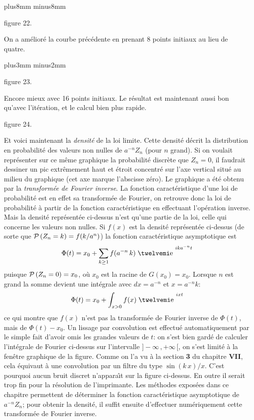 \null
\vskip-13mm plus8mm minus8mm
\centerline{ }
\vskip1mm
\centerline{\eightpoint figure 22.}
\vskip2mm
\centerline{\vbox{\hsize=9cm\eightpoint 
On a am\'elior\'e la courbe pr\'ec\'edente en prenant 8 points initiaux au 
lieu de quatre.}}

\vskip3mm
plus3mm minus2mm
\centerline{ }
\vskip1mm
\centerline{\eightpoint figure 23.}
\vskip2mm
\baselineskip=14pt 
\centerline{\vbox{\hsize=12cm\eightpoint
Encore mieux avec 16 points initiaux. Le r\'esultat est maintenant aussi
bon qu'avec l'it\'eration, et le calcul bien plus rapide.} }

\vskip1pt\break

\null\vfill
\vskip3pt
\centerline{ }
\vskip5mm
\centerline{\eightpoint figure 24.}
\vskip3mm
{\eightpoint\baselineskip=12pt
Et voici maintenant la {\it densit\'e} de la loi limite. Cette densit\'e
d\'ecrit la distribution en probabilit\'e des valeurs non nulles
de $a^{-n}Z_n$ (pour $n$ grand). Si on voulait repr\'esenter sur ce m\^eme
graphique la probabilit\'e discr\`ete que $Z_n = 0$, il faudrait dessiner 
un pic extr\^emement haut et \'etroit concentr\'e sur l'axe vertical 
situ\'e au milieu du graphique (cet axe marque l'abscisse z\'ero). 
\medskip
Le graphique a \'et\'e obtenu par la {\it transform\'ee de Fourier 
inverse}. La fonction caract\'eristique d'une loi de probabilit\'e est en 
effet sa transform\'ee de Fourier, on retrouve donc la loi de probabilit\'e
\`a partir de la  fonction caract\'eristique en effectuant l'op\'eration
inverse.  Mais la densit\'e repr\'esent\'ee ci-dessus n'est qu'une partie 
de la loi,  celle qui concerne les valeurs non nulles. Si $f(x)$ est la
densit\'e repr\'esent\'ee ci-dessus (de sorte que ${\cal P}\, (Z_n = k) =
f(k/a^n)$) la fonction caract\'eristique asymptotique est 
$$\Phi (t) = x_0 + \sum_{k\geq 1} f(a^{-n}\, k)\;\e^{ika^{-n}t}$$
puisque ${\cal P}\, (Z_n = 0) = x_0$, o\`u $x_0$ est la racine de 
$G(x_0) = x_0$. Lorsque $n$ est grand la somme devient une int\'egrale 
avec $dx = a^{-n}$ et $x = a^{-n}k$:
$$\Phi (t) = x_0 + \int_{x>0} f(x)\;\e^{ixt}$$
ce qui montre que $f(x)$ n'est pas la transform\'ee de Fourier 
inverse de $\Phi (t)$, mais de $\Phi (t) - x_0$.
Un lissage par convolution est effectu\'e automatiquement par le
simple fait d'avoir omis les grandes valeurs de $t$:  on s'est bien
gard\'e de calculer l'int\'egrale de Fourier ci-dessus sur l'intervalle
$]-\infty\, , +\infty\, [$,  on s'est limit\'e \`a la fen\^etre graphique
de la figure.  Comme on l'a vu \`a la section {\bf 3} du chapitre {\bf VII}, 
cela \'equivaut \`a une convolution par un filtre du type $\sin(k\, x) / x$.
C'est pourquoi aucun bruit discret n'appara{\^\i}t sur la figure ci-dessus. 
En outre il serait trop fin pour la r\'esolution de l'imprimante.
\medskip
Les m\'ethodes expos\'ees dans ce chapitre permettent de d\'eterminer
la fonction carac\-t\'eristique asymptotique de $a^{-n}Z_n$; pour obtenir
la densit\'e, il suffit ensuite d'effectuer num\'eriquement cette 
transform\'ee de Fourier inverse. } 


